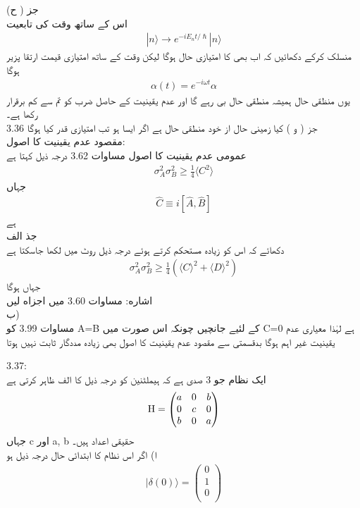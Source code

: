 جز ( ح)\\
اس کے ساتھ وقت کی تابعیت\\
\begin{align}|n\rangle\rightarrow e^{-iE_{n}t/\hslash}|n\rangle\end{align}
منسلک کرکے دکھائیں کہ
اب بھی
کا امتیازی حال ہوگا لیکن وقت کے ساتھ امتیازی قیمت ارتقا پزیر ہوگا\\
\begin{align}\alpha(t)=e^{-i\omega t}\alpha\end{align}
یوں منظقی حال ہمیشہ منطقی حال بی رہے گا اور عدم یقینیت کے حاصل ضرب کو تم سے کم برقرار رکھا ہے۔\\
جز ( و ) کیا زمینی حال
از خود منطقی حال ہے اگر ایسا ہو تب امتیازی قدر کیا ہوگا 
3.36\\
مقصود عدم یقینیت کا اصول:\\
عمومی عدم یقینيت کا اصول مساوات  3.62 درجہ ذيل کہتا ہے
\begin{align}\sigma_{A}^{2}\sigma_{B}^{2}\geq\frac{1}{4}\langle C^{2} \rangle\end{align}
جہاں
\begin{align}\hat{C}\equiv i[\hat{A},\hat{B}]\end{align}
ہے\\ 
جذ الف\\
دکھائے کہ اس کو زیادہ مستحكم کرتے ہوئے درجہ ذیل روٹ میں لکھا جاسکتا ہے
\begin{align}\sigma_{A}^{2}\sigma_{B}^{2}\geq\frac{1}{4}(\langle C\rangle^{2}+\langle D \rangle ^{2})\end{align}
جہاں
ہوگا\\
اشاره: مساوات 3.60 میں 
 اجزاه لیں\\
ب)\\
مساوات 3.99 کو
 A=B
  کے لئیے جانچیں چونکہ اس صورت میں
 C=0
   ہے لہٰذا  معیاری عدم یقینیت غیر اہم ہوگا بدقسمتی سے مقصود عدم یقینيت کا اصول بھی زیادہ مددگار ثابت نہیں ہوتا\\

 3.37:\\
ایک نظام جو 3 صدی ہے کہ ہیملٹنین کو درجہ ذيل کا الف ظاہر کرتی ہے
\begin{align}\text{\text{H}}=\begin{pmatrix}
a&0&b\\
0&c&0\\
b&0&a\\
\end{pmatrix}\end{align}
جہاں c اور a, b حقیقی اعداد ہیں۔\\
ا) اگر اس نظام کا ابتدائی حال درجہ ذيل ہو
\begin{align}|\delta(0) \rangle=\begin{pmatrix}
0\\
1\\
0\\
\end{pmatrix}\end{align}

